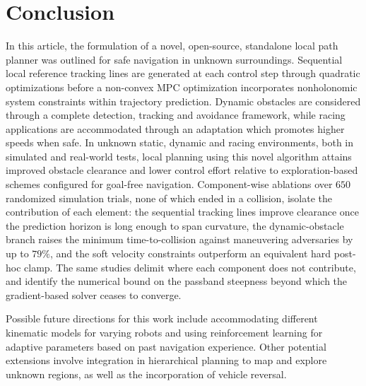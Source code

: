 \documentclass[journal]{IEEEtran}
\begin{document}
\section{Conclusion}\label{sec7} %
In this article, the formulation of a novel, open-source, standalone local path planner was outlined for safe navigation in unknown surroundings. Sequential local reference tracking lines are generated at each control step through quadratic optimizations before a non-convex MPC optimization incorporates nonholonomic system constraints within trajectory prediction. Dynamic obstacles are considered through a complete detection, tracking and avoidance framework, while racing applications are accommodated through an adaptation which promotes higher speeds when safe. In unknown static, dynamic and racing environments, both in simulated and real-world tests, local planning using this novel algorithm attains improved obstacle clearance and lower control effort relative to exploration-based schemes configured for goal-free navigation. Component-wise ablations over $650$ randomized simulation trials, none of which ended in a collision, isolate the contribution of each element: the sequential tracking lines improve clearance once the prediction horizon is long enough to span curvature, the dynamic-obstacle branch raises the minimum time-to-collision against maneuvering adversaries by up to $79\%$, and the soft velocity constraints outperform an equivalent hard post-hoc clamp. The same studies delimit where each component does not contribute, and identify the numerical bound on the passband steepness beyond which the gradient-based solver ceases to converge.

Possible future directions for this work include accommodating different kinematic models for varying robots and using reinforcement learning for adaptive parameters based on past navigation experience. Other potential extensions involve integration in hierarchical planning to map and explore unknown regions, as well as the incorporation of vehicle reversal.






\end{document}
